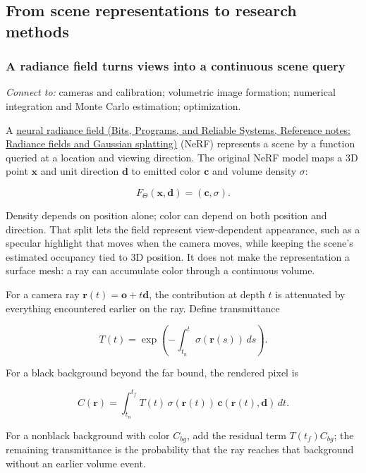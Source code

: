 \subsection{From scene representations to research methods}\label{04-visual-computing-ii-ch034-from-scene-representations-to-research-methods}

\subsubsection{A radiance field turns views into a continuous scene query}\label{04-visual-computing-ii-ch034-a-radiance-field-turns-views-into-a-continuous-scene-query}

\emph{Connect to:} cameras and calibration; volumetric image formation; numerical integration and Monte Carlo estimation; optimization.

A \href{../01-Bits-Programs-and-Reliable-Systems/main.pdf\#nameddest=appendix-c5b332e400e7}{neural radiance field (Bits, Programs, and Reliable Systems, Reference notes: Radiance fields and Gaussian splatting)} (NeRF) represents a scene by a function queried at a location and viewing direction. The original NeRF model maps a 3D point \(\mathbf{x}\) and unit direction \(\mathbf{d}\) to emitted color \(\mathbf{c}\) and volume density \(\sigma\):

\[F_\Theta(\mathbf{x},\mathbf{d})=(\mathbf{c},\sigma).\]

Density depends on position alone; color can depend on both position and direction. That split lets the field represent view-dependent appearance, such as a specular highlight that moves when the camera moves, while keeping the scene's estimated occupancy tied to 3D position. It does not make the representation a surface mesh: a ray can accumulate color through a continuous volume.

For a camera ray \(\mathbf{r}(t)=\mathbf{o}+t\mathbf{d}\), the contribution at depth \(t\) is attenuated by everything encountered earlier on the ray. Define transmittance

\[T(t)=\exp\left(-\int_{t_n}^{t}\sigma(\mathbf{r}(s))\,ds\right).\]

For a black background beyond the far bound, the rendered pixel is

\[C(\mathbf{r})=\int_{t_n}^{t_f}T(t)\,\sigma(\mathbf{r}(t))\,\mathbf{c}(\mathbf{r}(t),\mathbf{d})\,dt.\]

For a nonblack background with color \(C_{bg}\), add the residual term \(T(t_f)C_{bg}\); the remaining transmittance is the probability that the ray reaches that background without an earlier volume event.

